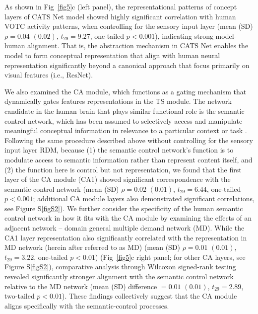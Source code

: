 \documentclass[pdflatex,sn-mathphys-num,lineno]{sn-jnl}%
\begin{document}
\begin{CJK}{UTF8}{gbsn}
As shown in Fig~\ref{fig5}c (left panel), the representational patterns of concept layers of CATS Net model showed highly significant correlation with human VOTC activity patterns, when controlling for the sensory input layer (mean (SD) $\rho = 0.04$ $(0.02)$, $t_{29} = 9.27$, one-tailed $p < 0.001$), indicating strong model-human alignment. That is, the abstraction mechanism in CATS Net enables the model to form conceptual representation that align with human neural representation significantly beyond a canonical approach that focus primarily on visual features (i.e., ResNet).

We also examined the CA module, which functions as a gating mechanism that dynamically gates features representations in the TS module. The network candidate in the human brain that plays similar functional role is the semantic control network, which has been assumed to selectively access and manipulate meaningful conceptual information in relevance to a particular context or task \cite{jackson_neural_2021}. Following the same procedure described above without controlling for the sensory input layer RDM, because (1) the semantic control network's function is to modulate access to semantic information rather than represent content itself, and (2) the function here is control but not representation, we found that the first layer of the CA module (CA1) showed significant correspondence with the semantic control network (mean (SD) $\rho = 0.02$ $(0.01)$, $t_{29} = 6.44$, one-tailed $p < 0.001$; additional CA module layers also demonstrated significant correlations, see Figure S\ref{figS2}). We further consider the specificity of the human semantic control network in how it fits with the CA module by examining the effects of an adjacent network – domain general multiple demand network (MD). While the CA1 layer representation also significantly correlated with the representation in MD network (herein after referred to as MD) \cite{fedorenko_broad_2013} (mean (SD) $\rho = 0.01$ $(0.01)$, $t_{29} = 3.22$, one-tailed $p < 0.01$) (Fig~\ref{fig5}c right panel; for other CA layers, see Figure S\ref{figS2}), comparative analysis through Wilcoxon signed-rank testing revealed significantly stronger alignment with the semantic control network relative to the MD network (mean (SD) difference $= 0.01$ $(0.01)$, $t_{29} = 2.89$, two-tailed $p < 0.01$). These findings collectively suggest that the CA module aligns specifically with the semantic-control processes.


\end{CJK}
\end{document}
